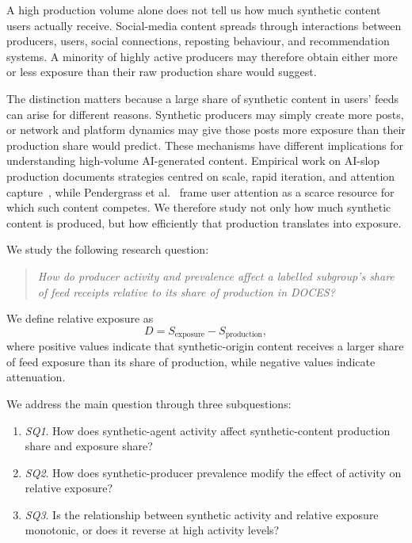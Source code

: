 \documentclass[runningheads]{llncs}
\begin{document}
A high production volume alone does not tell us how much synthetic content users actually receive. Social-media content spreads through interactions between producers, users, social connections, reposting behaviour, and recommendation systems. A minority of highly active producers may therefore obtain either more or less exposure than their raw production share would suggest.

The distinction matters because a large share of synthetic content in users' feeds can arise for different reasons. Synthetic producers may simply create more posts, or network and platform dynamics may give those posts more exposure than their production share would predict. These mechanisms have different implications for understanding high-volume AI-generated content. Empirical work on AI-slop production documents strategies centred on scale, rapid iteration, and attention capture~\cite{tang2026}, while Pendergrass et al.~\cite{pendergrass2025} frame user attention as a scarce resource for which such content competes. We therefore study not only how much synthetic content is produced, but how efficiently that production translates into exposure.

We study the following research question:

\begin{quote}
\textit{How do producer activity and prevalence affect a labelled subgroup's share of feed receipts relative to its share of production in DOCES?}
\end{quote}

We define relative exposure as
\[
D = S_{\mathrm{exposure}} - S_{\mathrm{production}},
\]
where positive values indicate that synthetic-origin content receives a larger
share of feed exposure than its share of production, while negative values
indicate attenuation.

We address the main question through three subquestions:
\begin{enumerate}
    \item \textit{SQ1}. How does synthetic-agent activity affect
    synthetic-content production share and exposure share?
    \item \textit{SQ2}. How does synthetic-producer prevalence modify the
    effect of activity on relative exposure?
    \item \textit{SQ3}. Is the relationship between synthetic activity and
    relative exposure monotonic, or does it reverse at high activity levels?
\end{enumerate}
\end{document}
